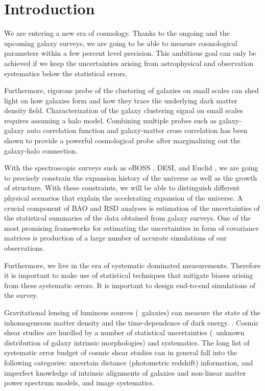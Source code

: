 \chapter*{Introduction}

We are entering a new era of cosmology. Thanks to the ongoing and 
the upcoming galaxy surveys, we are going to be able to measure cosmological 
parameters within a few percent level precision. This ambitious goal 
can only be achieved if we keep the uncertainties arising from 
astrophysical and observation systematics below the statistical errors.
 

Furthermore, rigorous probe of the clustering of galaxies on small scales 
can shed light on how galaxies form and how they trace the underlying dark matter density field.
Characterization of the galaxy clustering signal on small scales requires assuming a halo model. 
Combining multiple probes such as galaxy-galaxy auto correlation function and galaxy-matter cross 
correlation has been shown to provide a powerful cosmological probe after marginalizing out 
the galaxy-halo connection.

With the spectroscopic surveys such as eBOSS \citep{eboss}, DESI, and Euclid \citep{euclid}, 
we are going to precisely constrain the expansion history of the universe as well as the growth of structure. 
With these constraints, we will be able to distinguish different physical scenarios that explain the accelerating expansion of the universe. 
A crucial component of BAO and RSD analyses is estimation of the uncertainties of the statistical summaries of 
the data obtained from galaxy surveys. One of the most promising frameworks for estimating the uncertainties in form of covariance matrices is production 
of a large number of accurate simulations of our observations. 

Furthermore, we live in the era of systematic dominated measurements. 
Therefore it is important to make use of statistical techniques that mitigate 
biases arising from these systematic errors. It is important to design end-to-end simulations of the survey.

Gravitational lensing of luminous sources (\eg\ galaxies) can measure 
the state of the inhomogeneous matter density and the time-dependence of dark energy. 
\citep{}. Cosmic shear studies are hurdled by a number of statistical uncertainties (\eg\ unknown distribution 
of galaxy intrinsic morphologies) and systematics. The long list of systematic error budget 
of cosmic shear studies can in general fall into the following categories: uncertain distance 
(photometric redshift) information, and imperfect knowledge of intrinsic alignments of galaxies and non-linear matter 
power spectrum models, and image systematics. 

